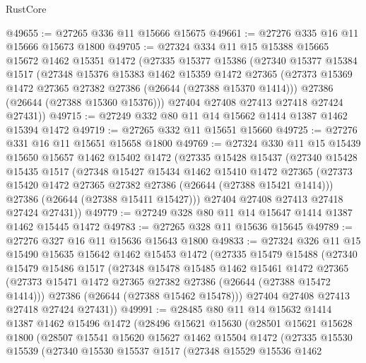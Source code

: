 \begin{lexlean}{RustCore}
\begin{coremodule}
@49655 := @27265 @336 @11 @15666 @15675
@49661 := @27276 @335 @16 @11 @15666 @15673 @1800
@49705 := @27324
    @334
    @11
    @15
    @15388
    @15665
    @15672
    @1462
    @15351
    @1472
    (@27335
      @15377
      @15386
      (@27340
        @15377
        @15384
        @1517
        (@27348
          @15376
          @15383
          @1462
          @15359
          @1472
          @27365
          (@27373 @15369 @1472 @27365 @27382 @27386 (@26644 (@27388 @15370 @1414)))
          @27386
          (@26644 (@27388 @15360 @15376)))
        @27404
        @27408
        @27413
        @27418
        @27424
        @27431))
@49715 := @27249 @332 @80 @11 @14 @15662 @1414 @1387 @1462 @15394 @1472
@49719 := @27265 @332 @11 @15651 @15660
@49725 := @27276 @331 @16 @11 @15651 @15658 @1800
@49769 := @27324
    @330
    @11
    @15
    @15439
    @15650
    @15657
    @1462
    @15402
    @1472
    (@27335
      @15428
      @15437
      (@27340
        @15428
        @15435
        @1517
        (@27348
          @15427
          @15434
          @1462
          @15410
          @1472
          @27365
          (@27373 @15420 @1472 @27365 @27382 @27386 (@26644 (@27388 @15421 @1414)))
          @27386
          (@26644 (@27388 @15411 @15427)))
        @27404
        @27408
        @27413
        @27418
        @27424
        @27431))
@49779 := @27249 @328 @80 @11 @14 @15647 @1414 @1387 @1462 @15445 @1472
@49783 := @27265 @328 @11 @15636 @15645
@49789 := @27276 @327 @16 @11 @15636 @15643 @1800
@49833 := @27324
    @326
    @11
    @15
    @15490
    @15635
    @15642
    @1462
    @15453
    @1472
    (@27335
      @15479
      @15488
      (@27340
        @15479
        @15486
        @1517
        (@27348
          @15478
          @15485
          @1462
          @15461
          @1472
          @27365
          (@27373 @15471 @1472 @27365 @27382 @27386 (@26644 (@27388 @15472 @1414)))
          @27386
          (@26644 (@27388 @15462 @15478)))
        @27404
        @27408
        @27413
        @27418
        @27424
        @27431))
@49991 := @28485
    @80
    @11
    @14
    @15632
    @1414
    @1387
    @1462
    @15496
    @1472
    (@28496
      @15621
      @15630
      (@28501
        @15621
        @15628
        @1800
        (@28507
          @15541
          @15620
          @15627
          @1462
          @15504
          @1472
          (@27335
            @15530
            @15539
            (@27340
              @15530
              @15537
              @1517
              (@27348
                @15529
                @15536
                @1462

\end{coremodule}
\end{lexlean}
